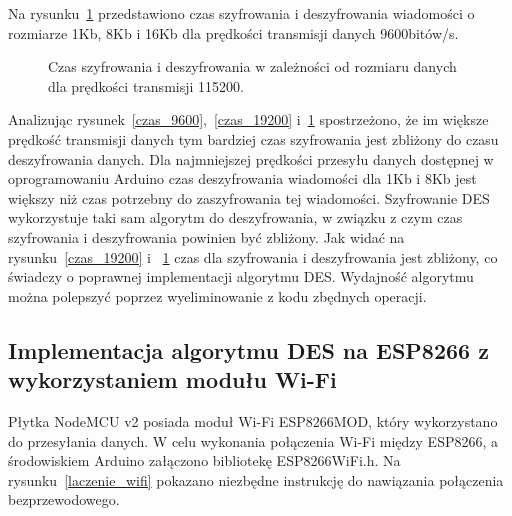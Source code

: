 \documentclass[12p]{article}
\begin{document}
Na rysunku~\ref{czas_115200} przedstawiono czas szyfrowania i deszyfrowania wiadomości o rozmiarze 1Kb, 8Kb i 16Kb dla prędkości transmisji danych 9600bitów/s.

\begin{figure}[H]
\centering
{}
\caption{Czas szyfrowania i deszyfrowania w zależności od rozmiaru danych dla prędkości transmisji 115200.}\label{czas_115200}
\end{figure}

Analizując rysunek~\ref{czas_9600},~\ref{czas_19200} i~\ref{czas_115200} spostrzeżono, że im większe prędkość transmisji danych tym bardziej czas szyfrowania jest zbliżony do czasu deszyfrowania danych. Dla najmniejszej prędkości przesyłu danych dostępnej w oprogramowaniu Arduino czas deszyfrowania wiadomości dla 1Kb i 8Kb jest większy niż czas potrzebny do zaszyfrowania tej wiadomości. Szyfrowanie DES wykorzystuje taki sam algorytm do deszyfrowania, w związku z czym czas szyfrowania i deszyfrowania  powinien być zbliżony. Jak widać na rysunku~\ref{czas_19200} i ~\ref{czas_115200} czas dla szyfrowania i deszyfrowania jest zbliżony, co świadczy o poprawnej implementacji algorytmu DES. Wydajność algorytmu można polepszyć poprzez wyeliminowanie z kodu zbędnych operacji. 

\subsection{Implementacja algorytmu DES na ESP8266 z wykorzystaniem modułu Wi-Fi}

\quad Płytka NodeMCU v2 posiada moduł Wi-Fi ESP8266MOD, który  wykorzystano do przesyłania danych. W celu wykonania połączenia Wi-Fi między ESP8266, a środowiskiem Arduino załączono bibliotekę ESP8266WiFi.h. Na rysunku~\ref{laczenie_wifi} pokazano niezbędne instrukcję do nawiązania połączenia bezprzewodowego. 
\end{document}
